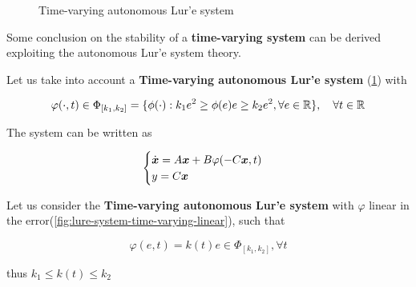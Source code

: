 \begin{figure}[htb]
    \centering
    \caption{Time-varying autonomous Lur'e system}
    \label{fig:lure-system-time-varying}
\end{figure}

Some conclusion on the stability of a \textbf{time-varying system} can be derived exploiting the autonomous Lur'e system theory.

Let us take into account a \textbf{Time-varying autonomous Lur'e system} (\cref{fig:lure-system-time-varying}) with

\[
    \varphi(\cdot,t) \in \Phi_{[k_1,k_2]} = \{\phi(\cdot) : k_1 e^2 \geq \phi(e)e \geq k_2 e^2, \forall e \in \mathbb{R} \}, \quad \forall t \in \mathbb{R}
\]

The system can be written as

\[
    \begin{cases}
        \dot{\boldsymbol{x}} = A \boldsymbol{x} + B \varphi(-C\boldsymbol{x}, t) \\
        y = C \boldsymbol{x}
    \end{cases}
\]

Let us consider the \textbf{Time-varying autonomous Lur'e system} with $\varphi$ linear in the error(\cref{fig:lure-system-time-varying-linear}), such that

\[
    \varphi(e,t) = k(t)e \in \Phi_{[k_1,k_2]}, \forall t
\]

thus $k_1 \leq k(t) \leq k_2$

